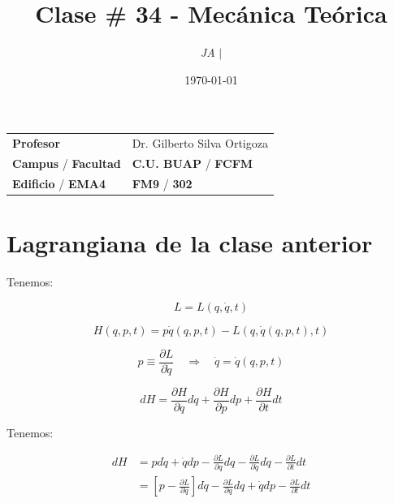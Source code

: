 \documentclass{article}
\title{Clase \# 34 - Mecánica Teórica}
\author{\emph{JA} $\boldsymbol{\mid}$}
\date{\today}
\begin{document}
\maketitle



\begin{mybox}
\noindent\begin{tabular}{@{}ll}
	{\bfseries{Profesor}} & Dr. Gilberto Silva Ortigoza\\
	\textcolor{prussianblue}{\bfseries{Campus}} / \textcolor{trueblue}{\bfseries{Facultad}}  & \textcolor{prussianblue}{\bfseries{C.U. BUAP}} /  \textcolor{trueblue}{\bfseries{FCFM}} \\
	\textcolor{prussianblue}{\bfseries{Edificio}} /  \textcolor{trueblue}{\bfseries{EMA4}}    & 	\textcolor{prussianblue}{\bfseries{FM9}} /  \textcolor{trueblue}{\bfseries{302}}   
\end{tabular} 
\end{mybox} \vspace{1cm}

\tableofcontents

\vspace{2cm}

\section{Lagrangiana de la clase anterior}

Tenemos: 

\[ L = L(q,\dot{q}, t)  \]

\[H(q,p,t) = p\dot{q} (q,p,t)  - L(q, \dot{q}(q,p,t),t) \]

\[ p \equiv \frac{ \partial L }{ \partial \dot{q} } \quad \Rightarrow \quad \dot{q} = \dot{q} (q,p,t)  \]


\[dH = \frac{\partial H}{\partial q}  dq + \frac{\partial H}{\partial p}dp+\frac{\partial H}{\partial t}dt\]


Tenemos:

\begin{equation}
\begin{split}
dH &= pd\dot{q} + \dot{q}dp-\frac{\partial L}{\partial q}dq - \frac{\partial L}{\partial \dot{q}}d\dot{q}-\frac{\partial L}{\partial t}dt \\
&= \left[ p - \frac{\partial L}{\partial \dot{q}} \right]d\dot{q} - \frac{\partial L}{\partial q}dq + \dot{q}dp - \frac{\partial L}{\partial t}dt
\end{split}
\end{equation}
\end{document}
